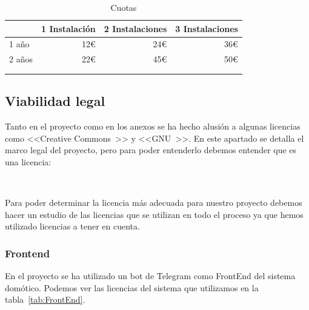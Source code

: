 \begin{longtable}[c]{@{}lrrr@{}}
\toprule
\centering
\multicolumn{1}{c}{\textbf{Tiempo}} & \multicolumn{1}{c}{\textbf{1 Instalación}} & \multicolumn{1}{c}{\textbf{2 Instalaciones}} & \multicolumn{1}{c}{\textbf{3 Instalaciones}}\\* \midrule
\endfirsthead
%
\endhead
%
\bottomrule
\endfoot
%
\endlastfoot
%
1 año & 12€ & 24€ & 36€ \\
2 años & 22€ & 45€ & 50€ \\ \bottomrule \\
\caption{Cuotas}
\label{tab:Cuotas1}
\end{longtable}

\subsection{Viabilidad legal}
Tanto en el proyecto como en los anexos se ha hecho alusión a algunas licencias como <<Creative Commons~\cite{wiki:Creative}>> y <<GNU~\cite{manual:GNU}>>. En este apartado se detalla el marco legal del proyecto, pero para poder entenderlo debemos entender que es una licencia:

\begin{displayquote}
~\cite{misc:WikiLicencia}
\end{displayquote}

Para poder determinar la licencia más adecuada para nuestro proyecto debemos hacer un estudio de las licencias que se utilizan en todo el proceso ya que hemos utilizado licencias a tener en cuenta.

\subsubsection{Frontend}
En el proyecto se ha utilizado un bot de Telegram como FrontEnd del sistema domótico. Podemos ver las licencias del sistema que utilizamos en la tabla~\ref{tab:FrontEnd}.


